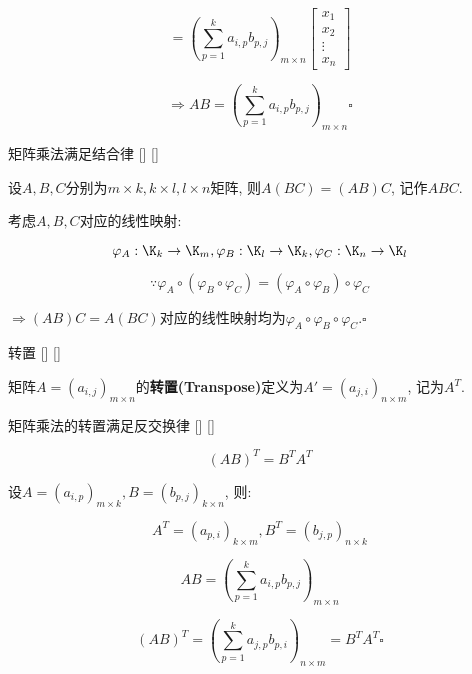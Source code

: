 \documentclass[UTF8]{ctexart}
\begin{document}
\begin{prf}
			$$
			=(\sum_{p=1}^{k}a_{i,p}b_{p,j})_{m\times n}\begin{bmatrix}x_1\\x_2\\\vdots\\x_n\end{bmatrix}
			$$
			
			$$\Longrightarrow AB=(\sum_{p=1}^{k}a_{i,p}b_{p,j})_{m\times n}\square$$
		\end{prf}
  
		\begin{ppt}
			[]
			{矩阵乘法满足结合律}
			[]
			[]
			
			设$A,B,C$分别为$m\times k, k\times l, l\times n$矩阵, 则$A(BC)=(AB)C$, 记作$ABC$. 
		\end{ppt}
  
		\begin{prf}
			考虑$A,B,C$对应的线性映射: 
			
			$$\varphi_A:\K_k\to\K_m,\varphi_B:\K_l\to\K_k,\varphi_C:\K_n\to\K_l$$
			
			$$\because\varphi_A\circ(\varphi_B\circ\varphi_C)=(\varphi_A\circ\varphi_B)\circ\varphi_C$$
			
			$\Longrightarrow (AB)C=A(BC)$对应的线性映射均为$\varphi_A\circ\varphi_B\circ\varphi_C.\square$
		\end{prf}
  
		\begin{dfn}
			[]
			{转置}
			[]
			[]

			矩阵$A=(a_{i,j})_{m\times n}$的\textbf{转置(Transpose)}定义为$A'=(a_{j,i})_{n\times m}$, 记为$A^T$. 
		\end{dfn}
		
		\begin{ppt}
			[]
			{矩阵乘法的转置满足反交换律}
			[]
			[]
			
			$$(AB)^T=B^TA^T$$
		\end{ppt}
  
		\begin{prf}
		
			设$A=(a_{i,p})_{m\times k}, B=(b_{p,j})_{k\times n}$, 则: 
			
			$$A^T=(a_{p,i})_{k\times m}, B^T=(b_{j,p})_{n\times k}$$
			
			$$AB=(\sum_{p=1}^{k}a_{i,p}b_{p,j})_{m\times n}$$
			
			$$(AB)^T=(\sum_{p=1}^{k}a_{j,p}b_{p,i})_{n\times m}=B^TA^T\square$$
		\end{prf}
\end{document}
